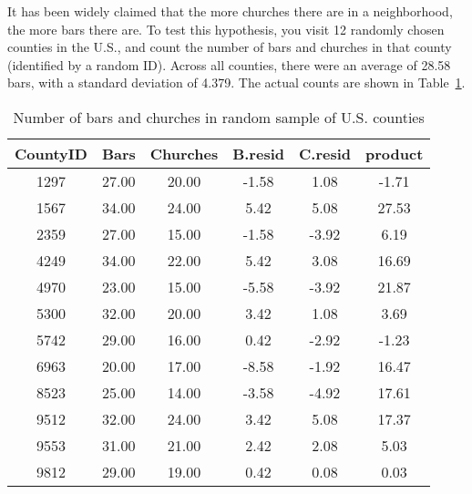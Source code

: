 \documentclass[11pt]{exam}
\begin{document}
\begin{questions}

%
 
  \question It has been widely claimed that the more churches there are in
  a neighborhood, the more bars there are.  To test this hypothesis, you
  visit 12 randomly chosen counties in the U.S., and count the number of
  bars and churches in that county (identified by a random ID).  Across all
  counties, there were an average of 
28.58 bars, with a standard deviation of 
4.379.  The actual counts are shown in Table~\ref{tab:church}.


\ifprintanswers
\begin{table}[ht]
\begin{center}
\begin{tabular}{|c|c|c|c|c|c|}
  \hline
CountyID & Bars & Churches & B.resid & C.resid & product \\ 
  \hline
1297 & 27.00 & 20.00 & -1.58 & 1.08 & -1.71 \\ 
   \hline
1567 & 34.00 & 24.00 & 5.42 & 5.08 & 27.53 \\ 
   \hline
2359 & 27.00 & 15.00 & -1.58 & -3.92 & 6.19 \\ 
   \hline
4249 & 34.00 & 22.00 & 5.42 & 3.08 & 16.69 \\ 
   \hline
4970 & 23.00 & 15.00 & -5.58 & -3.92 & 21.87 \\ 
   \hline
5300 & 32.00 & 20.00 & 3.42 & 1.08 & 3.69 \\ 
   \hline
5742 & 29.00 & 16.00 & 0.42 & -2.92 & -1.23 \\ 
   \hline
6963 & 20.00 & 17.00 & -8.58 & -1.92 & 16.47 \\ 
   \hline
8523 & 25.00 & 14.00 & -3.58 & -4.92 & 17.61 \\ 
   \hline
9512 & 32.00 & 24.00 & 3.42 & 5.08 & 17.37 \\ 
   \hline
9553 & 31.00 & 21.00 & 2.42 & 2.08 & 5.03 \\ 
   \hline
9812 & 29.00 & 19.00 & 0.42 & 0.08 & 0.03 \\ 
   \hline
\end{tabular}
\caption{Number of bars and churches in random sample of U.S. counties}
\label{tab:church}
\end{center}
\end{table}\else
% 
\begin{table}[ht]
\begin{center}

\end{center}
\end{table}
\end{questions}
\end{document}
